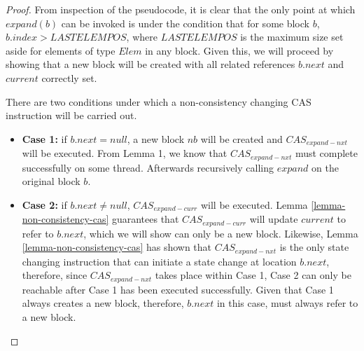 \documentclass[runningheads,a4paper]{llncs}
\begin{document}
\begin{proof}
%
%

From inspection of the pseudocode, it is clear that the only point at which
$expand(b)$ can be invoked is under the condition that for some block $b$,
$b.index > LASTELEMPOS$, where $LASTELEMPOS$ is the maximum size set aside for
elements of type $Elem$ in any block. Given this, we will proceed  by showing
that a new block will be created with all related references  $b.next$ and
$current$ correctly set.

There are two conditions under which a non-consistency changing CAS
instruction will be carried out. 

\begin{itemize}  \item \textbf{Case 1:} if $b.next=null$, a new block $nb$
will be created and $CAS_{expand-nxt}$ will be executed. From Lemma 1, we know that $CAS_{expand-nxt}$
must complete successfully on some thread. Afterwards recursively calling
$expand$ on the original block $b$. \item \textbf{Case 2:} if $b.next \neq
null$, $CAS_{expand-curr}$ will be executed. Lemma \ref{lemma-non-consistency-cas}
guarantees that $CAS_{expand-curr}$ will update $current$ to refer to $b.next$,  which we
will show can only be a new block. Likewise, Lemma \ref{lemma-non-consistency-cas} 
has shown that  $CAS_{expand-nxt}$ is the only state changing instruction that can
initiate a state change  at location $b.next$, therefore, since $CAS_{expand-nxt}$ takes
place within Case 1,   Case 2 can only be reachable after Case 1 has been
executed successfully. Given  that Case 1 always creates a new block,
therefore, $b.next$ in this case, must  always refer to a new block.
\end{itemize}


\end{proof}
\end{document}
